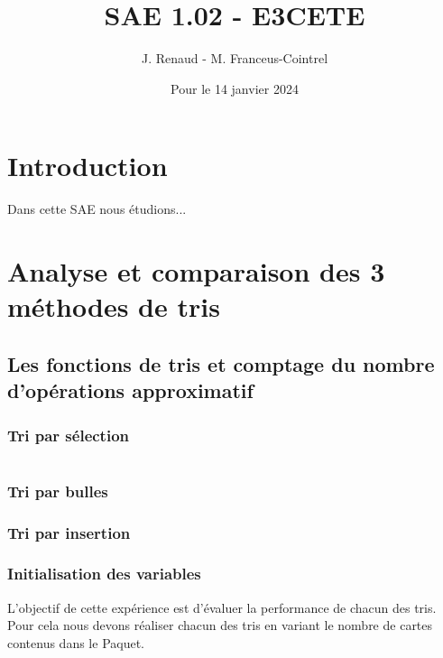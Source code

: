 \documentclass{report}
\title{\textbf{SAE 1.02 - E3CETE}}
\author{J. Renaud - M. Franceus-Cointrel}
\date{Pour le 14 janvier 2024}
\begin{document}
\maketitle
\tableofcontents

\chapter*{Introduction}

\qquad Dans cette SAE nous étudions...




\chapter{Analyse et comparaison des 3 méthodes de tris}

\qquad 

\section{Les fonctions de tris et comptage du nombre d'opérations approximatif}

\subsection{Tri par sélection}

\begin{lstlisting}[language=java, caption={\it Focntion marche aléatoire}, label=code1]
%insert code here
\end{lstlisting}

\subsection{Tri par bulles}

\subsection{Tri par insertion}

\pagebreak



\subsection{Initialisation des variables}

L'objectif de cette expérience est d'évaluer la performance de chacun des tris. Pour cela nous devons réaliser chacun des tris en variant le nombre de cartes contenus dans le Paquet.
\bigskip
\end{document}
